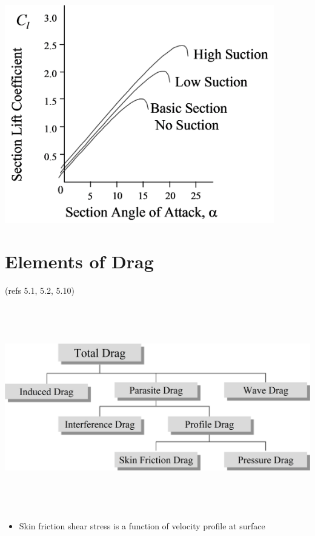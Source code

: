 \documentclass[
]{book}
\providecommand{\tightlist}{%
  \setlength{\itemsep}{0pt}\setlength{\parskip}{0pt}}
\begin{document}
\includegraphics[width=4.625in,height=3.738in]{media/05/image23.svg}

\hypertarget{elements-of-drag}{%
\section{Elements of Drag}\label{elements-of-drag}}

(refs 5.1, 5.2, 5.10)

\includegraphics[width=8.8in,height=3.5in]{media/05/image24.svg}

\begin{itemize}
\tightlist
\item
  Skin friction shear stress is a function of velocity profile at surface
\end{itemize}
\end{document}
